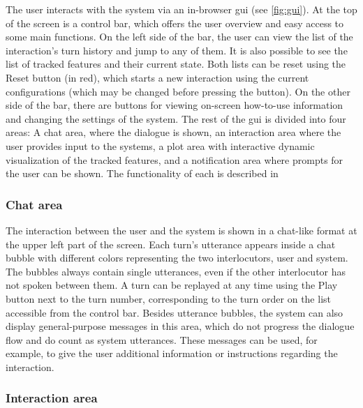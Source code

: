 The user interacts with the system via an in-browser \ac{gui} (see \cref{fig:gui}).
At the top of the screen is a control bar, which offers the user overview and easy access to some main functions.
On the left side of the bar, the user can view the list of the interaction's turn history and jump to any of them.
It is also possible to see the list of tracked features and their current state.
Both lists can be reset using the Reset button (in red), which starts a new interaction using the current configurations (which may be changed before pressing the button).
On the other side of the bar, there are buttons for viewing on-screen how-to-use information and changing the settings of the system.
The rest of the \ac{gui} is divided into four areas:
A chat area, where the dialogue is shown,
an interaction area where the user provides input to the systems,
a plot area with interactive dynamic visualization of the tracked features,
and a notification area where prompts for the user can be shown.
The functionality of each is described in 

\subsubsection{Chat area}
\label{subsubsec:chat_area}

The interaction between the user and the system is shown in a chat-like format at the upper left part of the screen.
Each turn's utterance appears inside a chat bubble with different colors representing the two interlocutors, user and system.
The bubbles always contain single utterances, even if the other interlocutor has not spoken between them.
A turn can be replayed at any time using the Play button next to the turn number, corresponding to the turn order on the list accessible from the control bar.
Besides utterance bubbles, the system can also display general-purpose messages in this area, which do not progress the dialogue flow and do count as system utterances.
These messages can be used, for example, to give the user additional information or instructions regarding the interaction.

\subsubsection{Interaction area}
\label{subsubsec:interaction_area}

